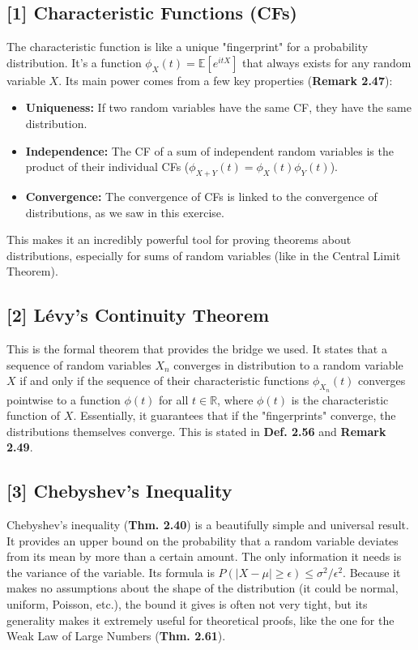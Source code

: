 \documentclass[11pt,a4paper]{article}
\begin{document}
\hypertarget{note1}{\subsection*{[1] Characteristic Functions (CFs)}}
The characteristic function is like a unique "fingerprint" for a probability distribution. It's a function $\phi_X(t) = \mathbb{E}[e^{itX}]$ that always exists for any random variable $X$. Its main power comes from a few key properties (\textbf{Remark 2.47}):
\begin{itemize}
    \item \textbf{Uniqueness:} If two random variables have the same CF, they have the same distribution.
    \item \textbf{Independence:} The CF of a sum of independent random variables is the product of their individual CFs ($\phi_{X+Y}(t) = \phi_X(t)\phi_Y(t)$).
    \item \textbf{Convergence:} The convergence of CFs is linked to the convergence of distributions, as we saw in this exercise.
\end{itemize}
This makes it an incredibly powerful tool for proving theorems about distributions, especially for sums of random variables (like in the Central Limit Theorem).

\hypertarget{note2}{\subsection*{[2] Lévy's Continuity Theorem}}
This is the formal theorem that provides the bridge we used. It states that a sequence of random variables $X_n$ converges in distribution to a random variable $X$ if and only if the sequence of their characteristic functions $\phi_{X_n}(t)$ converges pointwise to a function $\phi(t)$ for all $t \in \mathbb{R}$, where $\phi(t)$ is the characteristic function of $X$. Essentially, it guarantees that if the "fingerprints" converge, the distributions themselves converge. This is stated in \textbf{Def. 2.56} and \textbf{Remark 2.49}.

\hypertarget{note3}{\subsection*{[3] Chebyshev's Inequality}}
Chebyshev's inequality (\textbf{Thm. 2.40}) is a beautifully simple and universal result. It provides an upper bound on the probability that a random variable deviates from its mean by more than a certain amount. The only information it needs is the variance of the variable. Its formula is $P(|X - \mu| \ge \epsilon) \le \sigma^2 / \epsilon^2$. Because it makes no assumptions about the shape of the distribution (it could be normal, uniform, Poisson, etc.), the bound it gives is often not very tight, but its generality makes it extremely useful for theoretical proofs, like the one for the Weak Law of Large Numbers (\textbf{Thm. 2.61}).
\end{document}
